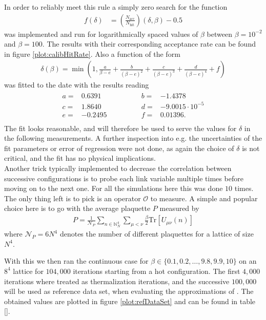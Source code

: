 In order to reliably meet this rule a simply zero search for the function
\begin{align*}
 f(\delta) & = \left(\frac{N_{\textrm{acc}}}{N_{\textrm{hit}}}\right)(\delta, \beta) - 0.5
\end{align*}
was implemented and run for logarithmically spaced values of $\beta$ between $\beta=10^{-2}$ and $\beta = 100$. The results with their corresponding acceptance rate can be found in figure \ref{plot:calibHitRate}. Also a function of the form
\begin{align*}
 \delta(\beta) = \min \left(1,\frac{a}{\beta-e} + \frac{b}{(\beta-e)^2} +  \frac{c}{(\beta-e)^3} + \frac{d}{(\beta-e)^4} + f \right)
\end{align*}
was fitted to the date with the results reading
\begin{align*}
 \begin{array}{rlrl}
  a= & 0.6391  \qquad \qquad & b= & -1.4378               \\
  c= & 1.8640  \qquad \qquad & d= & -9.0015 \cdot 10^{-5} \\
  e= & -0.2495 \qquad \qquad & f= & 0.01396 \textrm{.}    \\
 \end{array}
\end{align*}
The fit looks reasonable, and will therefore be used to serve the values for $\delta$ in the following measurements. A further inspection into e.g. the uncertainties of the fit parameters or error of regression were not done, as again the choice of $\delta$ is not critical, and the fit has no physical implications.\\

Another trick typically implemented to decrease the correlation between successive configurations is to probe each link variable multiple times before moving on to the next one. For all the simulations here this was done $10$ times.\\

The only thing left is to pick is an operator $\mathcal{O}$ to measure. A simple and popular choice here is to go with the average plaquette $P$ measured by
\begin{align*}
 P = \frac{1}{\mathcal{N}_P} \sum_{n \in \mathbb{N}^4_N} \sum_{\mu < \nu} \frac{\beta}{2} \mathrm{Tr} \left[ U_{\mu \nu} (n) \right]
\end{align*}
where $\mathcal{N}_P = 6 N^4$ denotes the number of different plaquettes for a lattice of size $N^4$.

With this we then ran the continuous case for $\beta \in \{0.1,0.2,\dots,9.8,9.9,10\}$ on an $8^4$ lattice for $104,000$ iterations starting from a hot configuration. The first $4,000$ iterations where treated as thermalization iterations, and the successive $100,000$ will be used as reference data set, when evaluating the approximations of \SUTwo. The obtained values are plotted in figure \ref{plot:refDataSet} and can be found in table \ref{}.

